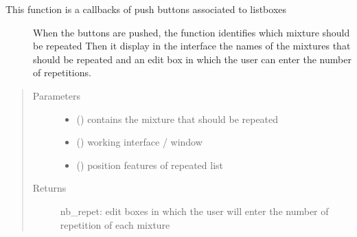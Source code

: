 \documentclass[letterpaper,10pt,english]{sphinxmanual}
\begin{document}
\begin{fulllineitems}
\label{\detokenize{ExperimentsPlannification:modules.fix_nb_repetition}}\begin{description}
\item[{This function is a callbacks of push buttons associated to listboxes}] \leavevmode
\sphinxAtStartPar
When the buttons are pushed, the function identifies which mixture should be repeated
Then it display in the interface the names of the mixtures that should be
repeated and an edit box in which the user can enter the number of repetitions.

\end{description}
\begin{quote}\begin{description}
\item[{Parameters}] \leavevmode\begin{itemize}
\item {} 
\sphinxAtStartPar
{} () \textendash{} contains the mixture that should be repeated

\item {} 
\sphinxAtStartPar
{} () \textendash{} working interface / window

\item {} 
\sphinxAtStartPar
{} () \textendash{} position features of repeated list

\end{itemize}

\item[{Returns}] \leavevmode
\sphinxAtStartPar
nb\_repet: edit boxes in which the user will enter the number of repetition of each mixture

\end{description}\end{quote}

\end{fulllineitems}

\label{\detokenize{ExperimentsPlannification:module-modules}}
\end{document}
